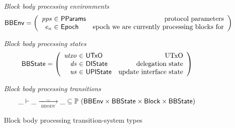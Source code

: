\documentclass[11pt,a4paper]{article}
\newcommand{\powerset}[1]{\mathbb{P}~#1}
\newcommand{\var}[1]{\mathit{#1}}
\newcommand{\type}[1]{\mathsf{#1}}
\newcommand{\trans}[2]{\xlongrightarrow[\textsc{#1}]{#2}}
\newcommand{\Block}{\type{Block}}
\newcommand{\ProtParams}{\type{PParams}} %
\begin{document}
\begin{figure}[ht]
  \emph{Block body processing environments}
  \begin{equation*}
    \BBEnv =
    \left(
      \begin{array}{r@{~\in~}lr}
        \var{pps} & \ProtParams & \text{protocol parameters} \\
        \var{e_n} & \Epoch & \text{epoch we are currently processing blocks for}
      \end{array}
    \right)
  \end{equation*}

  \emph{Block body processing states}
  \begin{equation*}
    \BBState =
    \left(
      \begin{array}{r@{~\in~}lr}
        \var{utxo} & \UTxO & \text{UTxO} \\
        \var{ds} & \DIState & \text{delegation state} \\
        \var{us} & \UPIState & \text{update interface state}
      \end{array}
    \right)
  \end{equation*}

  \emph{Block body processing transitions}
  \begin{equation*}
    \_ \vdash \var{\_} \trans{bbody}{\_} \var{\_} \subseteq
    \powerset (\BBEnv \times \BBState \times \Block \times \BBState)
  \end{equation*}
  \caption{Block body processing transition-system types}
  \label{fig:ts-types:bbody}
\end{figure}
\end{document}
